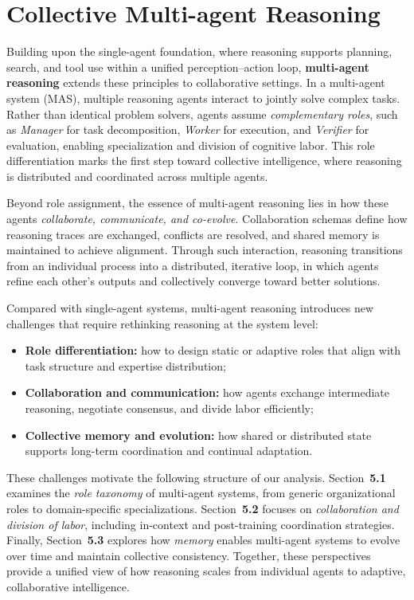 \section{Collective Multi-agent Reasoning}
\label{sec:collective}

Building upon the single-agent foundation, where reasoning supports planning, search, and tool use within a unified perception–action loop, \textbf{multi-agent reasoning} extends these principles to collaborative settings. 
In a multi-agent system (MAS), multiple reasoning agents interact to jointly solve complex tasks. 
Rather than identical problem solvers, agents assume \emph{complementary roles}, such as \textit{Manager} for task decomposition, \textit{Worker} for execution, and \textit{Verifier} for evaluation, enabling specialization and division of cognitive labor. 
This role differentiation marks the first step toward collective intelligence, where reasoning is distributed and coordinated across multiple agents.

Beyond role assignment, the essence of multi-agent reasoning lies in how these agents \emph{collaborate, communicate, and co-evolve}. 
Collaboration schemas define how reasoning traces are exchanged, conflicts are resolved, and shared memory is maintained to achieve alignment. 
Through such interaction, reasoning transitions from an individual process into a distributed, iterative loop, in which agents refine each other’s outputs and collectively converge toward better solutions.

Compared with single-agent systems, multi-agent reasoning introduces new challenges that require rethinking reasoning at the system level:
\begin{itemize}
    \item \textbf{Role differentiation:} how to design static or adaptive roles that align with task structure and expertise distribution;
    \item \textbf{Collaboration and communication:} how agents exchange intermediate reasoning, negotiate consensus, and divide labor efficiently;
    \item \textbf{Collective memory and evolution:} how shared or distributed state supports long-term coordination and continual adaptation.
\end{itemize}

These challenges motivate the following structure of our analysis.
Section~\textbf{5.1} examines the \emph{role taxonomy} of multi-agent systems, from generic organizational roles to domain-specific specializations. 
Section~\textbf{5.2} focuses on \emph{collaboration and division of labor}, including in-context and post-training coordination strategies. 
Finally, Section~\textbf{5.3} explores how \emph{memory} enables multi-agent systems to evolve over time and maintain collective consistency.
Together, these perspectives provide a unified view of how reasoning scales from individual agents to adaptive, collaborative intelligence.

